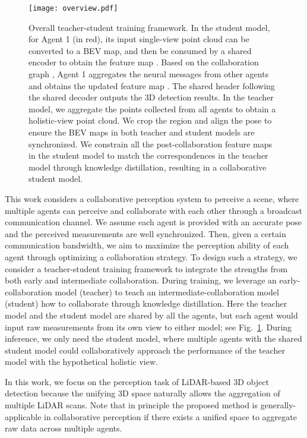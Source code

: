 \documentclass{article}
\begin{document}
\begin{figure}[t]
\centering
	\texttt{[image: overview.pdf]}
	\caption{Overall teacher-student training framework. In the student model, for Agent 1 (in red), its input single-view point cloud can be converted to a BEV map, and then be consumed by a shared encoder  to obtain the feature map . Based on the collaboration graph , Agent 1 aggregates the neural messages from other agents and obtains the updated feature map . The shared header following the shared decoder outputs the 3D detection results. In the teacher model, we aggregate the points collected from all agents to obtain a holistic-view point cloud. We crop the region and align the pose to ensure the BEV maps in both teacher and student models are synchronized. We constrain all the post-collaboration feature maps in the student model to match the correspondences in the teacher model through knowledge distillation, resulting in a collaborative student model.}
	\label{fig:overview}
	\vspace{-5mm}
\end{figure}


This work considers a collaborative perception system to perceive a scene, where multiple agents can perceive and collaborate with each other through a broadcast communication channel. We assume each agent is provided with an accurate pose and the perceived measurements are well synchronized. Then, given a certain communication bandwidth, we aim to maximize the perception ability of each agent through optimizing a collaboration strategy.  To design such a strategy, we consider a teacher-student training framework to integrate the strengths from both early and intermediate collaboration. During training, we leverage an early-collaboration model (teacher) to teach an intermediate-collaboration model (student) how to collaborate through knowledge distillation. Here the teacher model and the student model are shared by all the agents, but each agent would input raw measurements from its own view to either model; see Fig.~\ref{fig:overview}. During inference, we only need the student model, where multiple agents with the shared student model could collaboratively approach the performance of the teacher model with the hypothetical holistic view. 

In this work, we focus on the perception task of LiDAR-based 3D object detection because the unifying 3D space naturally allows the aggregation of multiple LiDAR scans. Note that in principle the proposed method is generally-applicable in collaborative perception if there exists a unified space to aggregate raw data across multiple agents.
\end{document}
